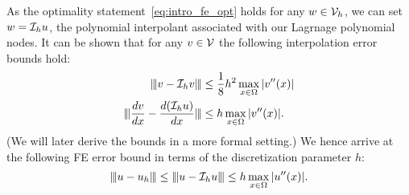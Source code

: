 As the optimality statement~\eqref{eq:intro_fe_opt} holds for any $w \in \mathcal{V}_h$, we can set $w = \mathcal{I}_h u$, the polynomial interpolant associated with our Lagrnage polynomial nodes.  It can be shown that for any $v \in \mathcal{V}$ the following interpolation error bounds hold:
\begin{align*}
  |\kern-1pt|\kern-1pt| v - \mathcal{I}_h v |\kern-1pt|\kern-1pt| &\leq \frac{1}{8} h^2 \max_{x \in \Omega} |v''(x)| \\
  |\kern-1pt|\kern-1pt| \frac{d v}{d x} - \frac{d (\mathcal{I}_h u)}{d x} |\kern-1pt|\kern-1pt| &\leq h \max_{x \in \Omega} |v''(x)| .
\end{align*}
(We will later derive the bounds in a more formal setting.) We hence arrive at the following FE error bound in terms of the discretization parameter $h$:
\begin{equation*}
  |\kern-1pt|\kern-1pt| u - u_h |\kern-1pt|\kern-1pt| \leq |\kern-1pt|\kern-1pt| u - \mathcal{I}_h u |\kern-1pt|\kern-1pt| \leq h \max_{x \in \Omega}  | u''(x) |.
\end{equation*}
